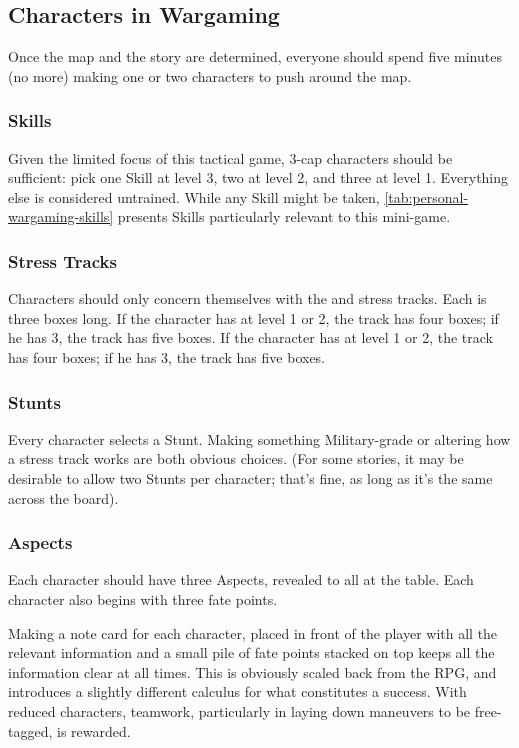\subsection{Characters in Wargaming}
\label{sec:characters-in-wargaming}

\iflandscape{}{}

Once the map and the story are determined, everyone should spend five minutes (no more) making one or two characters to push around the map.

\subsubsection{Skills}

Given the limited focus of this tactical game, 3-cap characters should be sufficient: pick one Skill at level 3, two at level 2, and three at level 1. Everything else is considered untrained. While any Skill might be taken, \autoref{tab:personal-wargaming-skills} presents Skills particularly relevant to this mini-game.


\subsubsection{Stress Tracks}

\iflandscape{}{}

Characters should only concern themselves with the \Health{} and \Composure{} stress tracks. Each is three boxes long. If the character has  at level 1 or 2, the \Composure{} track has four boxes; if he has  3, the \Composure{} track has five boxes. If the character has  at level 1 or 2, the \Health{} track has four boxes; if he has  3, the \Health{} track has five boxes.

\subsubsection{Stunts}

Every character selects a Stunt. Making something Military-grade or altering how a stress track works are both obvious choices. (For some stories, it may be desirable to allow two Stunts per character; that's fine, as long as it's the same across the board).

\newpage

\subsubsection{Aspects}

Each character should have three Aspects, revealed to all at the table. Each character also begins with three fate points.

Making a note card for each character, placed in front of the player with all the relevant information and a small pile of fate points stacked on top keeps all the information clear at all times. This is obviously scaled back from the RPG, and introduces a slightly different calculus for what constitutes a success. With reduced characters, teamwork, particularly in laying down maneuvers to be free-tagged, is rewarded.
